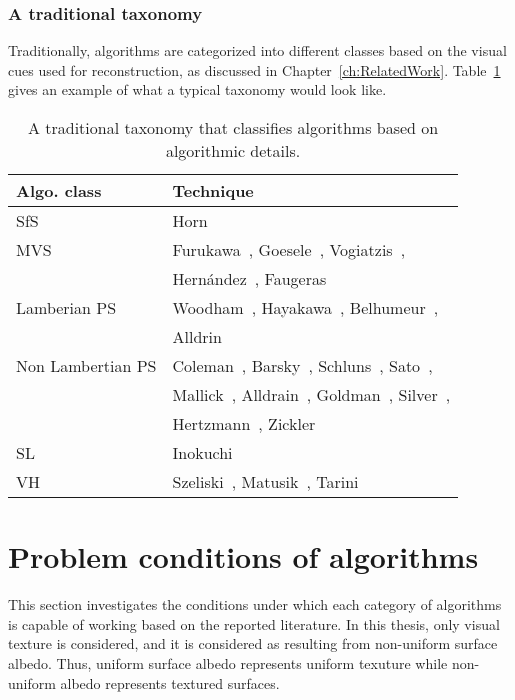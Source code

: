 \subsubsection{A traditional taxonomy}
Traditionally, algorithms are categorized into different classes based on the visual cues used for reconstruction, as discussed in Chapter~\ref{ch:RelatedWork}. 
Table~\ref{tab:class_algo} gives an example of what a typical taxonomy would look like.
\begin{table}[!htbp]
  \centering
  \begin{tabular}{l|l}
  \toprule
  \textbf{Algo. class} & \textbf{Technique}\\
  \midrule
  SfS & Horn~\cite{horn1970shape}\\
  MVS & Furukawa~\cite{furukawa2010accurate}, Goesele~\cite{goesele2006multi}, Vogiatzis~\cite{vogiatzis2007multiview}, \\
      & Hern{\'a}ndez~\cite{esteban2004silhouette}, Faugeras~\cite{faugeras2002variational}\\
  Lamberian PS & Woodham~\cite{woodham1980photometric}, Hayakawa~\cite{hayakawa1994photometric}, Belhumeur~\cite{belhumeur1999bas}, \\
      & Alldrin~\cite{alldrin2007resolving}\\
  Non Lambertian PS & Coleman~\cite{coleman1982obtaining}, Barsky~\cite{barsky20034}, Schluns~\cite{schluns1993photometric}, Sato~\cite{sato1994temporal}, \\
      & Mallick~\cite{mallick2005beyond}, Alldrain~\cite{alldrin2008photometric}, Goldman~\cite{goldman2010shape}, Silver~\cite{silver1980determining}, \\
      & Hertzmann~\cite{hertzmann2005example}, Zickler~\cite{zickler2002helmholtz}\\
  SL & Inokuchi~\cite{inokuchi1984range}\\
  VH & Szeliski~\cite{szeliski1993rapid}, Matusik~\cite{matusik2002efficient}, Tarini~\cite{tarini2002marching}\\
  \bottomrule
  \end{tabular}
  \caption{A traditional taxonomy that classifies algorithms based on algorithmic details.}
  \label{tab:class_algo}
\end{table}

\section{Problem conditions of algorithms}
This section investigates the conditions under which each category of algorithms is capable of working based on the reported literature. In this thesis, only visual texture is considered, and it is considered as resulting from non-uniform surface albedo. Thus, uniform surface albedo represents uniform texuture while non-uniform albedo represents textured surfaces.

